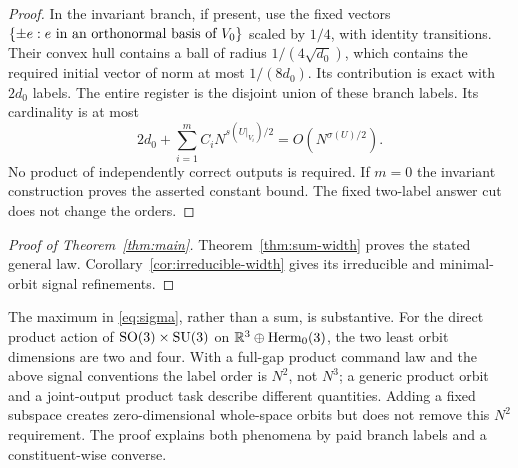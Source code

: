 \begin{proof}
In the invariant branch, if present, use the fixed vectors
$\{\pm e:e\hbox{ in an orthonormal basis of }V_0\}$ scaled by
$1/4$, with identity transitions. Their convex hull contains a ball
of radius $1/(4\sqrt{d_0})$, which contains the required initial
vector of norm at most $1/(8d_0)$. Its contribution is exact with
$2d_0$ labels. The entire register is the disjoint union of these
branch labels. Its cardinality is at most
\[
 2d_0+\sum_{i=1}^m C_i N^{s(U|_{V_i})/2}
                   =O(N^{\sigma(U)/2}).
\]
No product of independently correct outputs is required. If $m=0$
the invariant construction proves the asserted constant bound. The
fixed two-label answer cut does not change the orders.
\end{proof}

\begin{proof}[Proof of Theorem~\ref{thm:main}]
Theorem~\ref{thm:sum-width} proves the stated general law.
Corollary~\ref{cor:irreducible-width} gives its irreducible and
minimal-orbit signal refinements.
\end{proof}

The maximum in \eqref{eq:sigma}, rather than a sum, is substantive.
For the direct product action of $\operatorname{SO}(3)\times\operatorname{SU}(3)$ on
$\mathbb R^3\oplus\operatorname{Herm}_0(3)$, the two least orbit dimensions are two and
four. With a full-gap product command law and the above signal
conventions the label order is $N^2$, not $N^3$; a generic product
orbit and a joint-output product task describe different quantities.
Adding a fixed subspace creates zero-dimensional whole-space orbits
but does not remove this $N^2$ requirement. The proof explains both
phenomena by paid branch labels and a constituent-wise converse.


